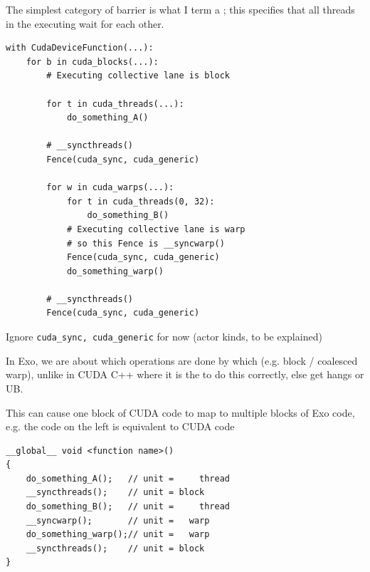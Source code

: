 \begin{minipage}[t]{0.48\textwidth}\fixminipage
The simplest category of barrier is what I term a ; this specifies that all threads in the executing  wait for each other.

\begin{verbatim}
with CudaDeviceFunction(...):
    for b in cuda_blocks(...):
        # Executing collective lane is block

        for t in cuda_threads(...):
            do_something_A()

        # __syncthreads()
        Fence(cuda_sync, cuda_generic)

        for w in cuda_warps(...):
            for t in cuda_threads(0, 32):
                do_something_B()
            # Executing collective lane is warp
            # so this Fence is __syncwarp()
            Fence(cuda_sync, cuda_generic)
            do_something_warp()

        # __syncthreads()
        Fence(cuda_sync, cuda_generic)
\end{verbatim}
\end{minipage}
\hfill
\begin{minipage}[t]{0.48\textwidth}\fixminipage
Ignore \texttt{cuda\_sync, cuda\_generic} for now (actor kinds, to be explained)

In Exo, we are  about which operations are done by which  (e.g. block / coalesced warp), unlike in CUDA C++ where it is the  to do this correctly, else get hangs or UB.

This can cause one block of CUDA code to map to multiple blocks of Exo code, e.g. the code on the left is equivalent to CUDA code
\begin{verbatim}
__global__ void <function name>()
{
    do_something_A();   // unit =     thread
    __syncthreads();    // unit = block
    do_something_B();   // unit =     thread
    __syncwarp();       // unit =   warp
    do_something_warp();// unit =   warp
    __syncthreads();    // unit = block
}
\end{verbatim}
\end{minipage}

\newpage
{}

